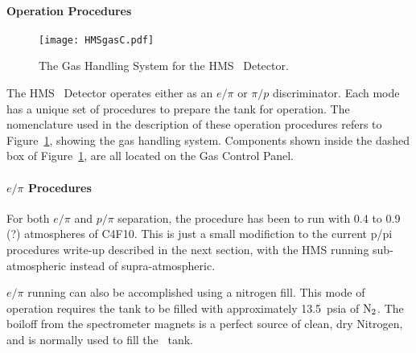 \paragraph{Operation Procedures}

\begin{figure}
\texttt{[image: HMSgasC.pdf]}
\caption{The Gas Handling System for the HMS \Cerenkov\ Detector. \label{fig:gas}}
\end{figure}

The HMS \Cerenkov\ Detector operates either as an $e/\pi$ or $\pi/p$
discriminator. Each mode has a unique set of procedures to prepare the tank
for operation. The nomenclature used in the description of these operation
procedures refers to Figure~\ref{fig:gas}, showing the gas handling system. Components
shown
inside the dashed box of Figure~\ref{fig:gas}, are all located on the Gas Control Panel.

\paragraph{$e/\pi$ Procedures}
For both $e/\pi$ and $p/\pi$ separation, the procedure
has been to run with 0.4 to
0.9 (?) atmospheres of C4F10.  This is just a small modifiction to the
current p/pi procedures write-up described in the next section,
with the HMS running sub-atmospheric instead of supra-atmospheric.

$e/\pi$ running can also be accomplished using a nitrogen fill.
This mode of operation requires the tank to be filled with approximately
13.5~psia of $\rm{N_2}$.  The boiloff from the spectrometer magnets is a
perfect source of clean, dry Nitrogen, and is normally used to fill the
\Cerenkov\ tank.

